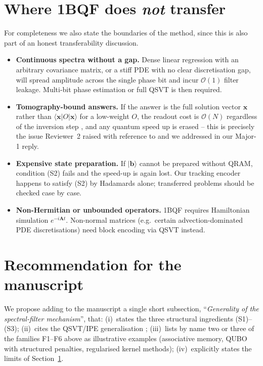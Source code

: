 \documentclass[11pt,a4paper]{article}
\newcommand{\OBQF}{\textsc{1BQF}}
\newcommand{\bra}[1]{\langle #1 |}
\newcommand{\ket}[1]{| #1 \rangle}
\begin{document}
\section{Where \OBQF{} does \emph{not} transfer}
\label{sec:limits}

For completeness we also state the boundaries of the method, since this
is also part of an honest transferability discussion.
\begin{itemize}[leftmargin=1.2em,topsep=2pt,itemsep=2pt]
  \item \textbf{Continuous spectra without a gap.} Dense linear
        regression with an arbitrary covariance matrix, or a stiff PDE
        with no clear discretisation gap, will spread amplitude across
        the single phase bit and incur $\mathcal{O}(1)$ filter leakage.
        Multi-bit phase estimation or full QSVT is then required.
  \item \textbf{Tomography-bound answers.} If the answer is the full
        solution vector $\mathbf{x}$ rather than $\bra{\mathbf{x}}O\ket{\mathbf{x}}$
        for a low-weight $O$, the readout cost is
        $\mathcal{O}(N)$ regardless of the inversion step
        \cite{Aaronson:2015:readingthefineprint}, and any quantum speed
        up is erased -- this is precisely the issue Reviewer~2 raised
        with reference to \cite{Tang:2019} and we addressed in our
        Major-1 reply.
  \item \textbf{Expensive state preparation.} If $\ket{\mathbf{b}}$
        cannot be prepared without QRAM, condition (S2) fails and the
        speed-up is again lost.  Our tracking encoder happens to satisfy
        (S2) by Hadamards alone; transferred problems should be checked
        case by case.
  \item \textbf{Non-Hermitian or unbounded operators.} \OBQF{} requires
        Hamiltonian simulation $e^{-i\mathbf{A}t}$. Non-normal matrices
        (e.g.\ certain advection-dominated PDE discretisations) need
        block encoding via QSVT instead.
\end{itemize}

\section{Recommendation for the manuscript}
\label{sec:recommendation}

We propose adding to the manuscript a single short subsection,
``\emph{Generality of the spectral-filter mechanism}'', that:
(i)~states the three structural ingredients (S1)--(S3);
(ii)~cites the QSVT/IPE generalisation
\cite{Gilyen:2019,Martyn:2021,Kitaev:1995};
(iii)~lists by name two or three of the families F1--F6 above as
illustrative examples (associative memory, QUBO with structured
penalties, regularised kernel methods);
(iv)~explicitly states the limits of Section~\ref{sec:limits}.
\end{document}
